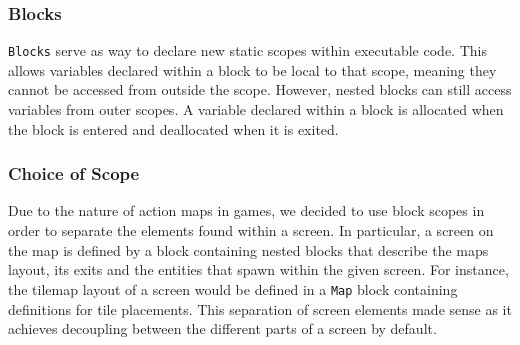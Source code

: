 \subsubsection{Blocks}
\texttt{Blocks} serve as way to declare new static scopes within executable code.
This allows variables declared within a block to be local to that scope, meaning they cannot be accessed from outside the scope.
However, nested blocks can still access variables from outer scopes.
A variable declared within a block is allocated when the block is entered and deallocated when it is exited\cite{sebesta_concepts_2016}.

\subsubsection{Choice of Scope}
Due to the nature of action maps in games, we decided to use block scopes in order to separate the elements found within a screen.
In particular, a screen on the map is defined by a block containing nested blocks that describe the maps layout, its exits and the entities that spawn within the given screen.
For instance, the tilemap layout of a screen would be defined in a \texttt{Map} block containing definitions for tile placements.
This separation of screen elements made sense as it achieves decoupling between the different parts of a screen by default.
